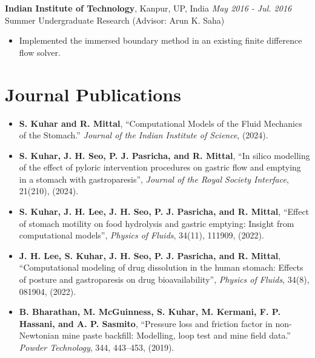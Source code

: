 \documentclass[11pt]{article}
\begin{document}
\vspace{4mm}

\noindent\textbf{Indian Institute of Technology}, Kanpur, UP, India \hfill \textit{May 2016 - Jul. 2016} \\
Summer Undergraduate Research (Advisor: Arun K. Saha)
\begin{itemize}[leftmargin=*,itemsep=1pt]
    \item Implemented the immersed boundary method in an existing finite difference flow solver.
\end{itemize}

\vspace{6mm}

\section*{Journal Publications}

\begin{itemize}[leftmargin=*,itemsep=1pt]
    \item \textbf{S. Kuhar and R. Mittal}, “Computational Models of the Fluid Mechanics of the Stomach.” \textit{Journal of the Indian Institute of Science}, (2024).
    \item \textbf{S. Kuhar, J. H. Seo, P. J. Pasricha, and R. Mittal}, “In silico modelling of the effect of pyloric intervention procedures on gastric flow and emptying in a stomach with gastroparesis”, \textit{Journal of the Royal Society Interface}, 21(210), (2024).
    \item \textbf{S. Kuhar, J. H. Lee, J. H. Seo, P. J. Pasricha, and R. Mittal}, “Effect of stomach motility on food hydrolysis and gastric emptying: Insight from computational models”, \textit{Physics of Fluids}, 34(11), 111909, (2022).
    \item \textbf{J. H. Lee, S. Kuhar, J. H. Seo, P. J. Pasricha, and R. Mittal}, “Computational modeling of drug dissolution in the human stomach: Effects of posture and gastroparesis on drug bioavailability”, \textit{Physics of Fluids}, 34(8), 081904, (2022).
    \item \textbf{B. Bharathan, M. McGuinness, S. Kuhar, M. Kermani, F. P. Hassani, and A. P. Sasmito}, “Pressure loss and friction factor in non-Newtonian mine paste backfill: Modelling, loop test and mine field data.” \textit{Powder Technology}, 344, 443–453, (2019).
\end{itemize}

\end{document}
